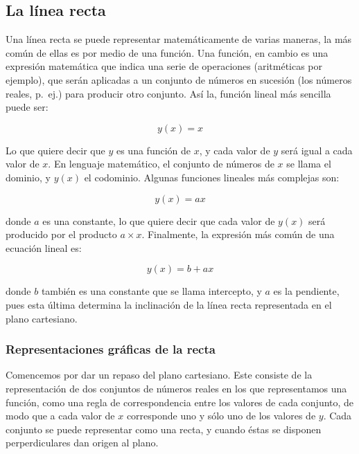 \documentclass[
]{book}
\begin{document}
\hypertarget{la-luxednea-recta}{%
\subsection{La línea recta}\label{la-luxednea-recta}}

Una línea recta se puede representar matemáticamente de varias maneras, la más común de ellas es por medio de una función. Una función, en cambio es una expresión matemática que indica una serie de operaciones (aritméticas por ejemplo), que serán aplicadas a un conjunto de números en sucesión (los números reales, p.~ej.) para producir otro conjunto. Así la, función lineal más sencilla puede ser:

\begin{equation}
    y(x) = x
\end{equation}

Lo que quiere decir que \(y\) es una función de \(x\), y cada valor de \(y\) será igual a cada valor de \(x\). En lenguaje matemático, el conjunto de números de \(x\) se llama el dominio, y \(y(x)\) el codominio. Algunas funciones lineales más complejas son:

\begin{equation}
    y(x) = ax
\end{equation}

donde \(a\) es una constante, lo que quiere decir que cada valor de \(y(x)\) será producido por el producto \(a \times x\). Finalmente, la expresión más común de una ecuación lineal es:

\begin{equation}
    y(x) = b + ax
\end{equation}

donde \(b\) también es una constante que se llama intercepto, y \(a\) es la pendiente, pues esta última determina la inclinación de la línea recta representada en el plano cartesiano.

\hypertarget{representaciones-gruxe1ficas-de-la-recta}{%
\subsubsection{Representaciones gráficas de la recta}\label{representaciones-gruxe1ficas-de-la-recta}}

Comencemos por dar un repaso del plano cartesiano. Este consiste de la representación de dos conjuntos de números reales en los que representamos una función, como una regla de correspondencia entre los valores de cada conjunto, de modo que a cada valor de \(x\) corresponde uno y sólo uno de los valores de \(y\). Cada conjunto se puede representar como una recta, y cuando éstas se disponen perperdiculares dan origen al plano.
\end{document}
